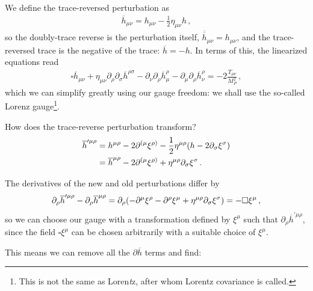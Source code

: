 \documentclass[main.tex]{subfiles}
\begin{document}
We define the trace-reversed perturbation as 
%
\begin{align}
\overline{h}_{\mu \nu } = h_{\mu \nu } - \frac{1}{2} \eta_{\mu \nu } h  
\,,
\end{align}
%
so the doubly-trace reverse is the perturbation itself, \(\overline{\overline{h}}_{\mu \nu } = h_{\mu \nu }\), and the trace-reversed trace is the negative of the trace: \(\overline{h} = - h\). 
In terms of this, the linearized equations read 
%
\begin{align}
\square \overline{h}_{\mu \nu } 
+ \eta_{\mu \nu } \partial_{\rho }\partial_{\sigma } \overline{h}^{\rho \sigma } 
-  \partial_{\nu } \partial_{\rho } \overline{h}^{\rho  }_{\mu } - \partial_{\mu } \partial_{\rho } \overline{h}^{\rho }_{\nu } = -2 \frac{T_{\mu \nu }}{M_P^2}
\,,
\end{align}
%
which we can simplify greatly using our gauge freedom:
we shall use the so-called Lorenz gauge\footnote{This is not the same as Loren\emph{t}z, after whom Lorentz covariance is called.}.

How does the trace-reverse perturbation transform? 
%
\begin{subequations}
\begin{align}
\overline{h}^{\prime  \mu \rho } &=  
h^{\mu \rho } - 2 \partial^{(\mu} \xi^{\rho )} - \frac{1}{2 } \eta^{\mu \rho } \qty(h - 2 \partial_{\sigma } \xi^{\sigma })
\\
&=
\overline{h}^{\mu \rho } - 2 \partial^{(\mu } \xi^{\rho )} + \eta^{\mu \rho } \partial_{\sigma } \xi^{\sigma }
\,.
\end{align}
\end{subequations}

The derivatives of the new and old perturbations differ by 
%
\begin{align}
\partial_{\rho } \overline{h}^{\prime \mu \rho }
- \partial_{\rho } \overline{h}^{\mu \rho } =
\partial_{\rho } \qty(- \partial^{\mu } \xi^{\rho } - \partial^{\rho }\xi^{\mu } + \eta^{\mu \rho } \partial_{\sigma } \xi^{\sigma})
= - \square \xi^{\mu }
\,,
\end{align}
%
so we can choose our gauge with a transformation defined by \(\xi^{\mu } \) such that \(\partial_{\rho} \overline{h}^{\prime \mu \rho }\), since the field \(\square \xi^{\mu }\) can be chosen arbitrarily with a suitable choice of \(\xi^{\mu }\).

This means we can remove all the \(\partial \overline{h}\) terms and find: 
%
%
\end{document}
